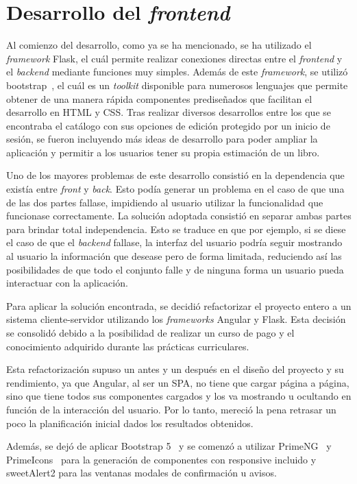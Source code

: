 \section{Desarrollo del \textit{frontend}}
Al comienzo del desarrollo, como ya se ha mencionado, se ha utilizado el \textit{framework} Flask, el cuál permite realizar conexiones directas entre el \textit{frontend} y el \textit{backend} mediante funciones muy simples. Además de este \textit{framework}, se utilizó bootstrap~\cite{Bootstrap5}, el cuál es un \textit{toolkit} disponible para numerosos lenguajes que permite obtener de una manera rápida componentes prediseñados que facilitan el desarrollo en HTML y CSS.
Tras realizar diversos desarrollos entre los que se encontraba el catálogo con sus opciones de edición protegido por un inicio de sesión, se fueron incluyendo más ideas de desarrollo para poder ampliar la aplicación y permitir a los usuarios tener su propia estimación de un libro.

Uno de los mayores problemas de este desarrollo consistió en la dependencia que existía entre \textit{front} y \textit{back}. Esto podía generar un problema en el caso de que una de las dos partes fallase, impidiendo al usuario utilizar la funcionalidad que funcionase correctamente. La solución adoptada consistió en separar ambas partes para brindar total independencia. Esto se traduce en que por ejemplo, si se diese el caso de que el \textit{backend} fallase, la interfaz del usuario podría seguir mostrando al usuario la información que desease pero de forma limitada, reduciendo así las posibilidades de que todo el conjunto falle y de ninguna forma un usuario pueda interactuar con la aplicación.

Para aplicar la solución encontrada, se decidió refactorizar el proyecto entero a un sistema cliente-servidor utilizando los \textit{frameworks} Angular y Flask. Esta decisión se consolidó debido a la posibilidad de realizar un curso de pago y el conocimiento adquirido durante las prácticas curriculares.


Esta refactorización supuso un antes y un después en el diseño del proyecto y su rendimiento, ya que Angular, al ser un SPA, no tiene que cargar página a página, sino que tiene todos sus componentes cargados y los va mostrando u ocultando en función de la interacción del usuario. Por lo tanto, mereció la pena retrasar un poco la planificación inicial dados los resultados obtenidos.

Además, se dejó de aplicar Bootstrap 5~\cite{Bootstrap5} y se comenzó a utilizar PrimeNG~\cite{PrimeNG} y PrimeIcons~\cite{PrimeIcons} para la generación de componentes con responsive incluido y sweetAlert2 para las ventanas modales de confirmación u avisos.

